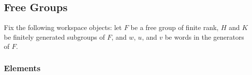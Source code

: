

\subsection{Free Groups}

Fix the following workspace objects: let $F$ be a free group of
finite rank, $H$ and $K$ be finitely generated subgroups of $F$, and
$w$, $u$, and $v$ be words in the generators of $F$.


\subsubsection{Elements}

